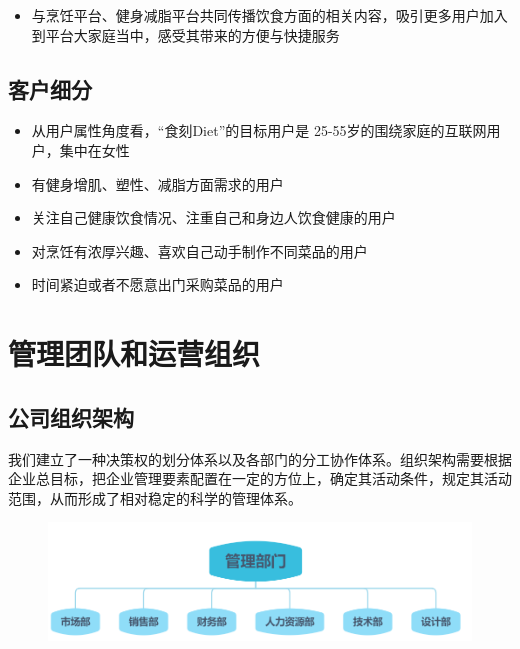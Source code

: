 \documentclass[UTF8,12pt]{ctexart}
\numberwithin{figure}{section}%
\begin{document}
\begin{spacing}{2}
\begin{itemize}
	\item 
	与烹饪平台、健身减脂平台共同传播饮食方面的相关内容，吸引更多用户加入到平台大家庭当中，感受其带来的方便与快捷服务 
		
\end{itemize}

\subsection{客户细分}
\begin{itemize}
	\item 从用户属性角度看，“食刻Diet”的目标用户是 25-55岁的围绕家庭的互联网用户，集中在女性
	
	\item 有健身增肌、塑性、减脂方面需求的用户
	
	\item 关注自己健康饮食情况、注重自己和身边人饮食健康的用户
	
	\item 对烹饪有浓厚兴趣、喜欢自己动手制作不同菜品的用户
	
	\item 时间紧迫或者不愿意出门采购菜品的用户
		
\end{itemize}


\newpage
\section{管理团队和运营组织}
\subsection{公司组织架构}
我们建立了一种决策权的划分体系以及各部门的分工协作体系。组织架构需要根据企业总目标，把企业管理要素配置在一定的方位上，确定其活动条件，规定其活动范围，从而形成了相对稳定的科学的管理体系。


\begin{figure}[!htb]
	\centering
	\includegraphics[width=12cm]{fig/10}
\end{figure}


\end{spacing}
\end{document}
